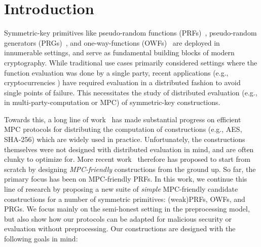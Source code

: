 
\section{Introduction}
\label{sec:introduction}



\medskip

Symmetric-key primitives like pseudo-random functions (PRFs)~\cite{goldreich1984-prf}, pseudo-random generators (PRGs)~\cite{?}, and one-way-functions (OWFs)~\cite{?} are deployed in innumerable settings, and serve as fundamental building blocks of modern cryptography. While traditional use cases primarily considered settings where the function evaluation was done by a single party, recent applications (e.g., cryptocurrencies ) have required evaluation in a distributed fashion to avoid single points of failure. This necessitates the study of distributed evaluation (e.g., in multi-party-computation or MPC) of symmetric-key constructions. 

Towards this, a long line of work~\cite{damgard2010-aes, pinkas2009-aes, wang2017-mpc} has made substantial progress on efficient MPC protocols for distributing the computation of constructions (e.g., AES, SHA-256) which are widely used in practice. Unfortunately, the constructions themselves were not designed with distributed evaluation in mind, and are often clunky to optimize for. More recent work~\cite{albrecht2015-lowmc, grassi2016-mpcfriendly, boneh2018-darkmatter} therefore has proposed to start from scratch by designing \textit{MPC-friendly} constructions from the ground up. So far, the primary focus has been on MPC-friendly PRFs. In this work, we continue this line of research by proposing a new suite of \textit{simple} MPC-friendly candidate constructions for a number of symmetric primitives: (weak)PRFs, OWFs, and PRGs. We focus mainly on the semi-honest setting in the preprocessing model, but also show how our protocols can be adapted for malicious security or evaluation without preprocessing. Our constructions are designed with the following goals in mind:

